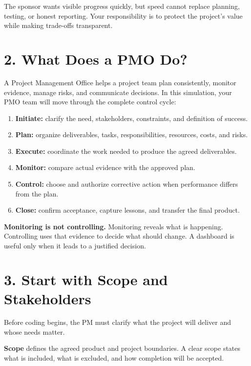 \documentclass[11pt,a4paper]{article}
\begin{document}
The sponsor wants visible progress quickly, but speed cannot replace planning, testing, or honest reporting. Your responsibility is to protect the project's value while making trade-offs transparent.

\section{2. What Does a PMO Do?}

A Project Management Office helps a project team plan consistently, monitor evidence, manage risks, and communicate decisions. In this simulation, your PMO team will move through the complete control cycle:

\begin{enumerate}
  \item \textbf{Initiate:} clarify the need, stakeholders, constraints, and definition of success.
  \item \textbf{Plan:} organize deliverables, tasks, responsibilities, resources, costs, and risks.
  \item \textbf{Execute:} coordinate the work needed to produce the agreed deliverables.
  \item \textbf{Monitor:} compare actual evidence with the approved plan.
  \item \textbf{Control:} choose and authorize corrective action when performance differs from the plan.
  \item \textbf{Close:} confirm acceptance, capture lessons, and transfer the final product.
\end{enumerate}

\begin{warningbox}
\textbf{Monitoring is not controlling.} Monitoring reveals what is happening. Controlling uses that evidence to decide what should change. A dashboard is useful only when it leads to a justified decision.
\end{warningbox}

\section{3. Start with Scope and Stakeholders}

Before coding begins, the PM must clarify what the project will deliver and whose needs matter.

\textbf{Scope} defines the agreed product and project boundaries. A clear scope states what is included, what is excluded, and how completion will be accepted.
\end{document}
